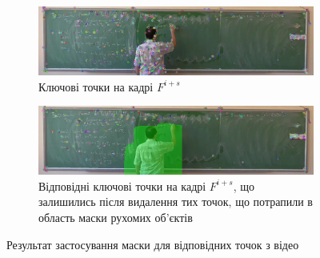 \begin{figure}[H]
    \centering
    \begin{subfigure}[b]{0.55\textwidth}
        \centering
        \includegraphics[width=\textwidth]{images/next_frame_kp}
        \caption{Ключові точки на кадрі $F^{i+s}$
            \label{fig:yakovlev:keypoints:a}
        }
    \end{subfigure}
    \begin{subfigure}[b]{0.55\textwidth}
        \centering
        \includegraphics[width=\textwidth]{images/next_frame_matches_mask}
        \caption{Відповідні ключові точки на кадрі $F^{i+s}$, що залишились після
            видалення тих точок, що потрапили в область маски рухомих
            об'єктів
            \label{fig:yakovlev:keypoints:b}
        }
    \end{subfigure}
    \caption{Результат застосування маски для відповідних точок з відео \cite{yakovlev_video}
        \label{fig:yakovlev:keypoints}
    }
\end{figure}
